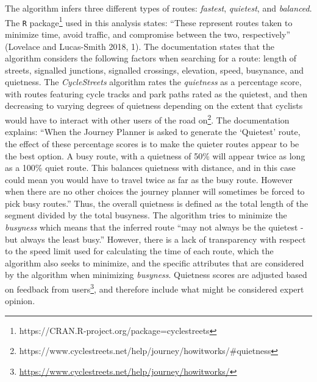 \documentclass[smallextended]{svjour3}       %
\begin{document}
The algorithm infers three different types of routes: \emph{fastest},
\emph{quietest}, and \emph{balanced}. The \texttt{R}
package\footnote{https://CRAN.R-project.org/package=cyclestreets} used
in this analysis states: ``These represent routes taken to minimize
time, avoid traffic, and compromise between the two, respectively''
(Lovelace and Lucas-Smith 2018, 1). The documentation states that the
algorithm considers the following factors when searching for a route:
length of streets, signalled junctions, signalled crossings, elevation,
speed, busynance, and quietness. The \emph{CycleStreets} algorithm rates
the \emph{quietness} as a percentage score, with routes featuring cycle
tracks and park paths rated as the quietest, and then decreasing to
varying degrees of quietness depending on the extent that cyclists would
have to interact with other users of the road
on\footnote{https://www.cyclestreets.net/help/journey/howitworks/\#quietness}.
The documentation explains: ``When the Journey Planner is asked to
generate the `Quietest' route, the effect of these percentage scores is
to make the quieter routes appear to be the best option. A busy route,
with a quietness of 50\% will appear twice as long as a 100\% quiet
route. This balances quietness with distance, and in this case could
mean you would have to travel twice as far as the busy route. However
when there are no other choices the journey planner will sometimes be
forced to pick busy routes.'' Thus, the overall quietness is defined as
the total length of the segment divided by the total busyness. The
algorithm tries to minimize the \emph{busyness} which means that the
inferred route ``may not always be the quietest - but always the least
busy.'' However, there is a lack of transparency with respect to the
speed limit used for calculating the time of each route, which the
algorithm also seeks to minimize, and the specific attributes that are
considered by the algorithm when minimizing \emph{busyness}. Quietness
scores are adjusted based on feedback from
users\footnote{\url{https://www.cyclestreets.net/help/journey/howitworks/}},
and therefore include what might be considered expert opinion.
\end{document}
